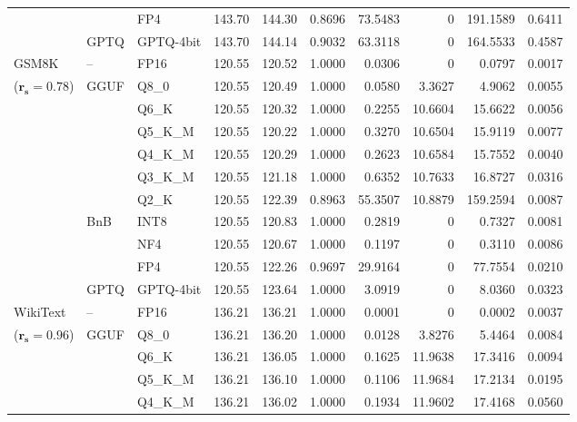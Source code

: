 \begin{longtable}{ll l rrrrrrr}
 &  & FP4 & 143.70 & 144.30 & \cellcolor{red!18} 0.8696 & \cellcolor{red!18} 73.5483 & \cellcolor{cyan!12} $0$ & \cellcolor{red!18} 191.1589 & \cellcolor{red!18} 0.6411 \\
 & GPTQ & GPTQ-4bit & 143.70 & 144.14 & \cellcolor{red!18} 0.9032 & \cellcolor{red!18} 63.3118 & \cellcolor{cyan!12} $0$ & \cellcolor{red!18} 164.5533 & \cellcolor{red!18} 0.4587 \\
\midrule
GSM8K & -- & FP16 & 120.55 & 120.52 & 1.0000 & 0.0306 & \cellcolor{cyan!12} $0$ & 0.0797 & 0.0017 \\
{\small ($\mathbf{r_s{=}0.78}$)} & GGUF & Q8\_0 & 120.55 & 120.49 & 1.0000 & 0.0580 & 3.3627 & 4.9062 & 0.0055 \\
 &  & Q6\_K & 120.55 & 120.32 & 1.0000 & 0.2255 & 10.6604 & 15.6622 & 0.0056 \\
 &  & Q5\_K\_M & 120.55 & 120.22 & 1.0000 & 0.3270 & 10.6504 & 15.9119 & 0.0077 \\
 &  & Q4\_K\_M & 120.55 & 120.29 & 1.0000 & 0.2623 & 10.6584 & 15.7552 & 0.0040 \\
 &  & Q3\_K\_M & 120.55 & 121.18 & 1.0000 & 0.6352 & 10.7633 & 16.8727 & 0.0316 \\
 &  & Q2\_K & 120.55 & 122.39 & \cellcolor{red!18} 0.8963 & \cellcolor{red!18} 55.3507 & 10.8879 & \cellcolor{red!18} 159.2594 & \cellcolor{red!18} 0.0087 \\
 & BnB & INT8 & 120.55 & 120.83 & 1.0000 & 0.2819 & \cellcolor{cyan!12} $0$ & 0.7327 & 0.0081 \\
 &  & NF4 & 120.55 & 120.67 & 1.0000 & 0.1197 & \cellcolor{cyan!12} $0$ & 0.3110 & 0.0086 \\
 &  & FP4 & 120.55 & 122.26 & 0.9697 & 29.9164 & \cellcolor{cyan!12} $0$ & 77.7554 & 0.0210 \\
 & GPTQ & GPTQ-4bit & 120.55 & 123.64 & 1.0000 & 3.0919 & \cellcolor{cyan!12} $0$ & 8.0360 & 0.0323 \\
\midrule
WikiText & -- & FP16 & 136.21 & 136.21 & 1.0000 & 0.0001 & \cellcolor{cyan!12} $0$ & 0.0002 & 0.0037 \\
{\small ($\mathbf{r_s{=}0.96}$)} & GGUF & Q8\_0 & 136.21 & 136.20 & 1.0000 & 0.0128 & 3.8276 & 5.4464 & 0.0084 \\
 &  & Q6\_K & 136.21 & 136.05 & 1.0000 & 0.1625 & 11.9638 & 17.3416 & 0.0094 \\
 &  & Q5\_K\_M & 136.21 & 136.10 & 1.0000 & 0.1106 & 11.9684 & 17.2134 & 0.0195 \\
 &  & Q4\_K\_M & 136.21 & 136.02 & 1.0000 & 0.1934 & 11.9602 & 17.4168 & 0.0560 \\

\end{longtable}
